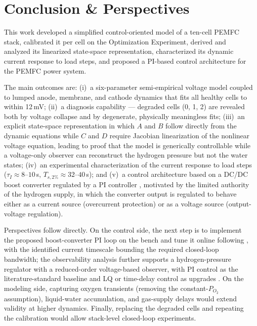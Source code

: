 
\chapter{Conclusion \& Perspectives}

\label{Chapter6}

This work developed a simplified control-oriented model of a ten-cell PEMFC stack,
calibrated it per cell on the Optimization Experiment, derived and analyzed its
linearized state-space representation, characterized its dynamic current response
to load steps, and proposed a PI-based control architecture for the PEMFC power
system.

The main outcomes are: (i)~a six-parameter semi-empirical voltage model coupled to
lumped anode, membrane, and cathode dynamics that fits all healthy cells to within
12\,mV; (ii)~a diagnosis capability --- degraded cells (0, 1, 2) are revealed both
by voltage collapse and by degenerate, physically meaningless fits;
(iii)~an explicit state-space representation in which $A$ and $B$ follow directly
from the dynamic equations while $C$ and $D$ require Jacobian linearization of the
nonlinear voltage equation, leading to proof that the model is generically
controllable while a voltage-only observer can reconstruct the hydrogen pressure
but not the water states; (iv)~an experimental characterization of the current
response to load steps ($\tau_I\approx 8$--$10$\,s,
$T_{s,2\%}\approx 32$--$40$\,s); and (v)~a control architecture based on a DC/DC
boost converter regulated by a PI controller \cite{derbeli2017}, motivated by the
limited authority of the hydrogen supply, in which the converter output is
regulated to behave either as a current source (overcurrent protection) or as a
voltage source (output-voltage regulation).

Perspectives follow directly. On the control side, the next step is to implement
the proposed boost-converter PI loop on the bench and tune it online following
\cite{derbeli2017}, with the identified current timescale bounding the required
closed-loop bandwidth; the observability analysis further supports a
hydrogen-pressure regulator with a reduced-order voltage-based observer, with PI
control as the literature-standard baseline \cite{zhu2017,derbeli2017} and LQ or
time-delay control as upgrades \cite{pukrushpan2003,kim2010}. On the modeling
side, capturing oxygen transients (removing the constant-$P_{O_2}$ assumption),
liquid-water accumulation, and gas-supply delays \cite{kharrat2025} would extend
validity at higher dynamics. Finally, replacing the degraded cells and repeating
the calibration would allow stack-level closed-loop experiments.
